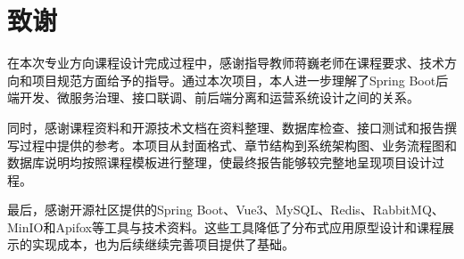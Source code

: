 
\chapter*{致谢}

在本次专业方向课程设计完成过程中，感谢指导教师蒋巍老师在课程要求、技术方向和项目规范方面给予的指导。通过本次项目，本人进一步理解了Spring Boot后端开发、微服务治理、接口联调、前后端分离和运营系统设计之间的关系。

同时，感谢课程资料和开源技术文档在资料整理、数据库检查、接口测试和报告撰写过程中提供的参考。本项目从封面格式、章节结构到系统架构图、业务流程图和数据库说明均按照课程模板进行整理，使最终报告能够较完整地呈现项目设计过程。

最后，感谢开源社区提供的Spring Boot、Vue3、MySQL、Redis、RabbitMQ、MinIO和Apifox等工具与技术资料。这些工具降低了分布式应用原型设计和课程展示的实现成本，也为后续继续完善项目提供了基础。
